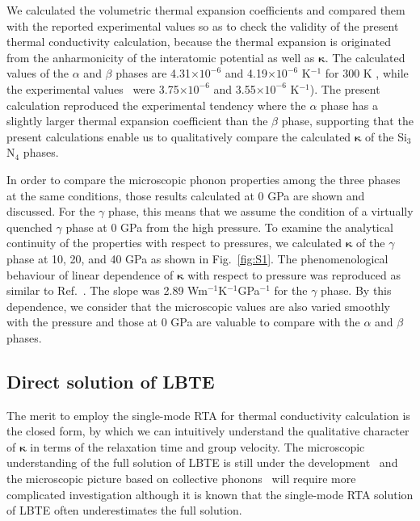 \documentclass[twocolumn,amsmath,amssymb,a4paper,prb,superscriptaddress,floatfix]{revtex4-1}
\begin{document}
We calculated the volumetric thermal expansion coefficients and compared them
with the reported experimental values so as to check the validity of the
present thermal conductivity calculation, because the thermal expansion is
originated from the anharmonicity of the interatomic potential as well as
$\boldsymbol{\kappa}$. The calculated values of the $\alpha$ and $\beta$ phases
are 4.31$\times 10^{-6}$ and 4.19$\times 10^{-6}$ K$^{-1}$ for 300 K , while
the experimental values~\cite{minikayev-alpha} were 3.75$\times 10^{-6}$ and
3.55$\times 10^{-6}$ K$^{-1}$). The present calculation reproduced the
experimental tendency where the $\alpha$ phase has a slightly larger thermal
expansion coefficient than the $\beta$ phase, supporting that the present
calculations enable us to qualitatively compare the calculated
$\boldsymbol{\kappa}$ of the Si$_3$N$_4$ phases.

In order to compare the microscopic phonon properties among the three phases at
the same conditions, those results calculated at 0 GPa are shown and discussed.
For the $\gamma$ phase, this means that we assume the condition of a virtually
quenched $\gamma$ phase at 0 GPa from the high pressure. To examine the
analytical continuity of the properties with respect to pressures, we
calculated $\boldsymbol{\kappa}$ of the $\gamma$ phase at 10, 20, and 40 GPa as
shown in Fig.~\ref{fig:S1}. The phenomenological behaviour of linear dependence
of $\boldsymbol{\kappa}$ with respect to pressure was reproduced as similar to
Ref.~. The slope was 2.89
Wm$^{-1}$K$^{-1}$GPa$^{-1}$ for the $\gamma$ phase.  By this dependence, we
consider that the microscopic values are also varied smoothly with the pressure
and those at 0 GPa are valuable to compare with the $\alpha$ and $\beta$
phases.

\subsection{Direct solution of LBTE}

The merit to employ the single-mode RTA for thermal conductivity calculation is
the closed form, by which we can intuitively understand the qualitative
character of $\boldsymbol{\kappa}$ in terms of the relaxation time and group velocity. The
microscopic understanding of the full solution of LBTE is still under the
development~\cite{cepellotti-relaxons} and the microscopic picture based on
collective phonons~\cite{hardy-collective} will require more complicated
investigation although it is known that the single-mode RTA solution of LBTE
often underestimates the full solution.~\cite{mukhopadhyay-ltc,ward-ltc}
\end{document}
